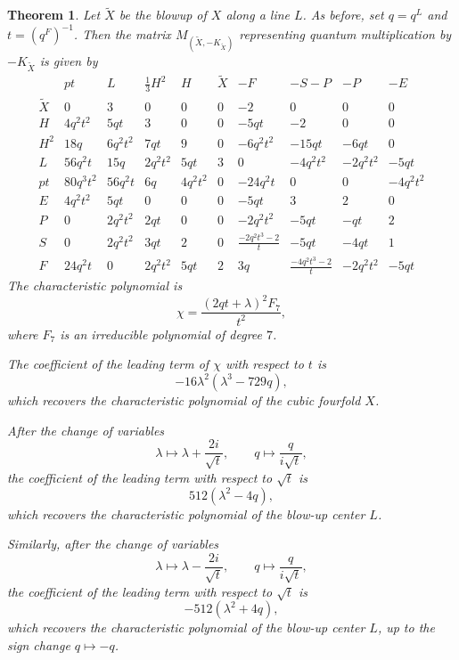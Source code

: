 \documentclass[10pt,a4paper]{amsart}
\newtheorem{theorem}{Theorem}[section]
\numberwithin{equation}{section}
\begin{document}
\begin{theorem}\label{tMatrixCubicFourfoldLine}
Let $\widetilde{X}$ be the blowup of $X$ along a line $L$. As before, set $q = q^L$ and $t = (q^F)^{-1}$.
Then the matrix $M_{(\widetilde{X},-K_{\widetilde{X}})}$ representing quantum
multiplication by $-K_{\widetilde{X}}$ is given by
\[
\renewcommand{\arraystretch}{1.2}
\begin{array}{c|ccccc|cccc}
	& pt & L & \frac{1}{3}H^2 & H & \widetilde{X} & -F & -S-P & -P & -E \\
	\hline
       \widetilde{X} & 0&3&0&0&0&-2&0&0&0\\
       H & 4q^{2}t^{2}&5qt&3&0&0&-5qt&-2&0&0\\
       H^2 & 18q&6q^{2}t^{2}&7qt&9&0&-6q^{2}t^{2}&-15qt&-6qt&0\\
       L & 56q^{2}t&15q&2q^{2}t^{2}&5qt&3&0&-4q^{2}t^{2}&-2q^{2}t^{2}&-5qt\\
       pt & 80q^{3}t^{2}&56q^{2}t&6q&4q^{2}t^{2}&0&-24q^{2}t&0&0&-4q^{2}t^{2}\\
       \hline
       E & 4q^{2}t^{2}&5qt&0&0&0&-5qt&3&2&0\\
       P & 0&2q^{2}t^{2}&2qt&0&0&-2q^{2}t^{2}&-5qt&-qt&2\\
       S & 0&2q^{2}t^{2}&3qt&2&0&\frac{-2q^{2}t^{3}-2}{t}&-5qt&-4qt&1\\
       F & 24q^{2}t&0&2q^{2}t^{2}&5qt&2&3q&\frac{-4q^{2}t^{3}-2}{t}&-2q^{2}t^{2}&-5qt
 \end{array}
\]
The characteristic polynomial is
\[
    \chi =
    \frac{(2qt+\lambda)^2 F_7}{t^2},
\]
where $F_7$ is an irreducible polynomial of degree $7$. 

The coefficient of the leading term of $\chi$ with respect to $t$ is
\[
    -16\lambda^2(\lambda^3 - 729q),
\]
which recovers the characteristic polynomial of the cubic fourfold $X$.

After the change of variables
\[
    \lambda \mapsto \lambda + \frac{2i}{\sqrt{t}},
    \qquad
    q \mapsto \frac{q}{i\sqrt{t}},
\]
the coefficient of the leading term with respect to $\sqrt{t}$ is
\[
    512(\lambda^2 - 4q),
\]
which recovers the characteristic polynomial of the blow-up center $L$.

Similarly, after the change of variables
\[
    \lambda \mapsto \lambda - \frac{2i}{\sqrt{t}},
    \qquad
    q \mapsto \frac{q}{i\sqrt{t}},
\]
the coefficient of the leading term with respect to $\sqrt{t}$ is
\[
    -512(\lambda^2 + 4q),
\]
which recovers the characteristic polynomial of the blow-up center $L$, up to
the sign change $q \mapsto -q$.
\end{theorem}
\end{document}
